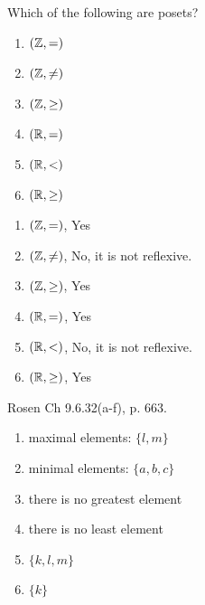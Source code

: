 \begin{questions}
    \ifprintanswers
        \vspace{-10pt}
    \fi
{} Which of the following are posets? 
\ifprintanswers
        \vspace{-15pt}
\else
\begin{enumerate}[label=(\alph*),itemsep=0pt,parsep=0pt,
topsep=0pt,partopsep=0pt]
	\item $(\mathbb{Z}, =)$
	\item $(\mathbb{Z}, \neq)$
	\item $(\mathbb{Z}, \geq)$
	\item $(\mathbb{R}, =)$
	\item $(\mathbb{R}, <)$
	\item $(\mathbb{R}, \geq)$
\end{enumerate}
\fi
    \begin{solution}
    \begin{enumerate}[label=(\alph*),itemsep=0pt,parsep=0pt,
		topsep=0pt,partopsep=0pt]
		\item $(\mathbb{Z}, =)$, Yes
		\item $(\mathbb{Z}, \neq)$, No, it is not reflexive. 
		\item $(\mathbb{Z}, \geq)$, Yes
		\item $(\mathbb{R}, =)$, Yes
		\item $(\mathbb{R}, <)$, No, it is not reflexive.
		\item $(\mathbb{R}, \geq)$, Yes
	\end{enumerate}
    \end{solution}



    \ifprintanswers
        \vspace{-10pt}
    \fi
{} Rosen Ch 9.6.32(a-f), p. 663.
    \ifprintanswers
        \vspace{-15pt}
    \fi
    \begin{solution}
    \begin{enumerate}[label=(\alph*),itemsep=0pt,parsep=0pt,topsep=0pt,partopsep=0pt]
        \item maximal elements: $\{ l, m\}$
        \item minimal elements: $\{ a, b, c \}$
        \item there is no greatest element
        \item there is no least element
        \item $\{ k, l, m\}$
        \item $\{ k \}$
    \end{enumerate}
    \end{solution}



\end{questions}
